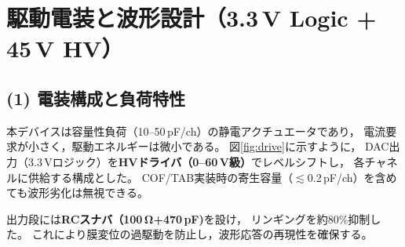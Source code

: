 \documentclass[conference]{IEEEtran}
\begin{document}
\section{駆動電装と波形設計（3.3\,V Logic + 45\,V HV）}

\subsection*{(1) 電装構成と負荷特性}
本デバイスは容量性負荷（10--50\,pF/ch）の静電アクチュエータであり，
電流要求が小さく，駆動エネルギーは微小である。
図\ref{fig:drive}に示すように，
DAC出力（3.3\,Vロジック）を\textbf{HVドライバ（0--60\,V級）}でレベルシフトし，
各チャネルに供給する構成とした。
COF/TAB実装時の寄生容量（$\lesssim$0.2\,pF/ch）を含めても波形劣化は無視できる。

出力段には\textbf{RCスナバ（100\,\si{\ohm}+470\,\si{\pico\farad})}を設け，
リンギングを約80\%抑制した。
これにより膜変位の過駆動を防止し，波形応答の再現性を確保する。
\end{document}

